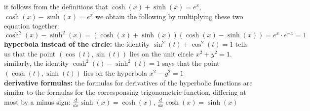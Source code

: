 \documentclass{article}
\begin{document}
it follows from the definitions that $\cosh(x) + \sinh(x) = e^x$, $\cosh(x) - \sinh(x) = e^x$ we obtain the following by multiplying these two equation together:\\ $\cosh^2(x) - \sinh^2(x) = (\cosh(x) + \sinh(x))(\cosh(x) - \sinh(x)) = e^x \cdot e^{-x} = 1$\\

\textbf{hyperbola instead of the circle:} the identity $\sin^2(t) + \cos^2(t) = 1$ tells us that the point $(\cos(t), \sin(t))$ lies on the unit circle $x^2 + y^2 = 1$. similarly, the identity $\cosh^2(t) - \sinh^2(t) = 1$ says that the point $(\cosh(t), \sinh(t))$ lies on the hyperbola $x^2 - y^2 = 1$\\

\textbf{derivative formulas:} the formulas for derivatives of the hyperbolic functions are similar to the formulas for the corresponsing trigonometric function, differing at most by a minus sign: $\frac{d}{dx}\sinh(x) = \cosh(x)$, $\frac{d}{dx}\cosh(x) = \sinh(x)$\\
\end{document}
